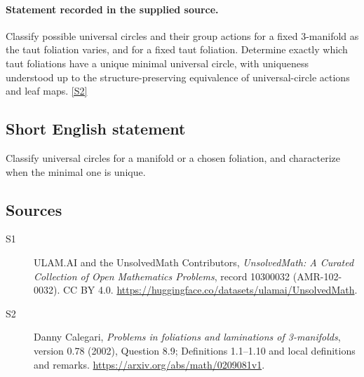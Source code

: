 \documentclass[11pt]{article}
\newcommand{\sref}[2]{\hyperlink{source:#1:#2}{[S#2]}}
\begin{document}
\paragraph{Statement recorded in the supplied source.}
Classify possible universal circles and their group actions for a fixed $3$-manifold as the taut foliation varies, and for a fixed taut foliation. Determine exactly which taut foliations have a unique minimal universal circle, with uniqueness understood up to the structure-preserving equivalence of universal-circle actions and leaf maps. \sref{10300032}{2}
\subsection{Short English statement}
Classify universal circles for a manifold or a chosen foliation, and characterize when the minimal one is unique.
\subsection{Sources}
\begin{description}
\item[\hypertarget{source:10300032:1}{S1}] ULAM.AI and the UnsolvedMath Contributors, \emph{UnsolvedMath: A Curated Collection of Open Mathematics Problems}, record 10300032 (AMR-102-0032). CC BY 4.0. \url{https://huggingface.co/datasets/ulamai/UnsolvedMath}.
\item[\hypertarget{source:10300032:2}{S2}] Danny Calegari, \emph{Problems in foliations and laminations of 3-manifolds}, version 0.78 (2002), Question 8.9; Definitions 1.1--1.10 and local definitions and remarks. \url{https://arxiv.org/abs/math/0209081v1}.
\end{description}
\label{end:10300032}
\end{document}
